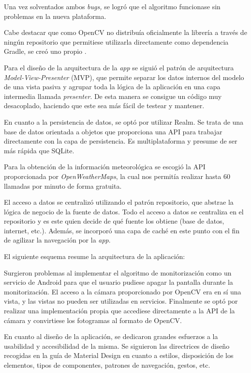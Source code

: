 Una vez solventados ambos \emph{bugs,} se logró que el algoritmo
funcionase sin problemas en la nueva plataforma.

Cabe destacar que como OpenCV no distribuía oficialmente la librería a
través de ningún repositorio que permitiese utilizarla directamente como
dependencia Gradle, se creó uno propio \citep{gobees:prototipes}.

Para el diseño de la arquitectura de la \emph{app} se siguió el patrón
de arquitectura \emph{Model-View-Presenter} (MVP), que permite separar
los datos internos del modelo de una vista pasiva y agrupar toda la
lógica de la aplicación en una capa intermedia llamada \emph{presenter}.
De esta manera se consigue un código muy desacoplado, haciendo que este
sea más fácil de testear y mantener.

En cuanto a la persistencia de datos, se optó por utilizar Realm. Se
trata de una base de datos orientada a objetos que proporciona una API
para trabajar directamente con la capa de persistencia. Es
multiplataforma y presume de ser más rápida que SQLite.

Para la obtención de la información meteorológica se escogió la API
proporcionada por \emph{OpenWeatherMaps}, la cual nos permitía realizar
hasta 60 llamadas por minuto de forma gratuita.

El acceso a datos se centralizó utilizando el patrón repositorio, que
abstrae la lógica de negocio de la fuente de datos. Todo el acceso a
datos se centraliza en el repositorio y es este quien decide de qué
fuente los obtiene (base de datos, internet, etc.). Además, se incorporó
una capa de caché en este punto con el fin de agilizar la navegación por
la \emph{app}.

El siguiente esquema resume la arquitectura de la aplicación:


Surgieron problemas al implementar el algoritmo de monitorización como
un servicio de Android para que el usuario pudiese apagar la pantalla
durante la monitorización. El acceso a la cámara proporcionado por
OpenCV era en sí una vista, y las vistas no pueden ser utilizadas en
servicios. Finalmente se optó por realizar una implementación propia que
accediese directamente a la API de la cámara y convirtiese los
fotogramas al formato de OpenCV.

En cuanto al diseño de la aplicación, se dedicaron grandes esfuerzos a
la usabilidad y accesibilidad de la misma. Se siguieron las directrices
de diseño recogidas en la guía de Material Design en cuanto a estilos,
disposición de los elementos, tipos de componentes, patrones de
navegación, gestos, etc.

